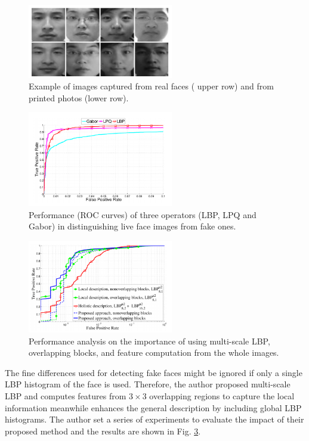 \documentclass[journal]{IEEEtran}
\begin{document}
\begin{figure}[!t]
\centering
\includegraphics[width=2.5in]{img/2-A-5.png}
\caption{Example of images captured from real faces ( upper row) and from printed photos (lower row). }
\label{Example of real faces and photos}
\end{figure}

\begin{figure}[!t]
\centering
\includegraphics[width=2.5in]{img/2-A-6.png}
\caption{Performance (ROC curves) of three operators (LBP, LPQ and Gabor) in distinguishing live face images from fake ones.}
\label{ROC}
\end{figure}

\begin{figure}[!t]
\centering
\includegraphics[width=2.5in]{img/2-A-7.png}
\caption{Performance analysis on the importance of using multi-scale LBP, overlapping blocks, and feature computation from the whole images.}
\label{multiscale}
\end{figure}

The fine differences used for detecting fake faces might be ignored if only a single LBP histogram of the face is used. Therefore, the author proposed multi-scale LBP and computes features from $3\times
3$ overlapping regions to capture the local information meanwhile enhances the general description by including global LBP histograms. The author set a series of experiments to evaluate the impact of their proposed method and the results are shown in Fig. \ref{multiscale}.
\end{document}
